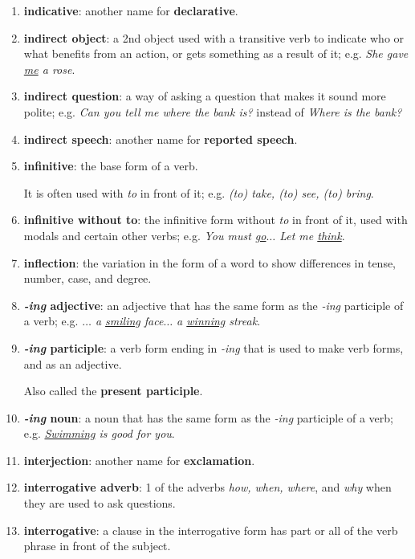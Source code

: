 \documentclass[oneside]{book}
\numberwithin{equation}{section}
\begin{document}
\begin{enumerate}
    \item \textbf{indicative}: another name for \textbf{declarative}.
    \item \textbf{indirect object}: a 2nd object used with a transitive verb to indicate who or what benefits from an action, or gets something as a result of it; e.g. \textit{She gave \underline{me} a rose}.
    \item \textbf{indirect question}: a way of asking a question that makes it sound more polite; e.g. \textit{Can you tell me where the bank is?} instead of \textit{Where is the bank?}
    \item \textbf{indirect speech}: another name for \textbf{reported speech}.
    \item \textbf{infinitive}: the base form of a verb.
    
    It is often used with \textit{to} in front of it; e.g. \textit{(to) take, (to) see, (to) bring}.
    \item \textbf{infinitive without to}: the infinitive form without \textit{to} in front of it, used with modals and certain other verbs; e.g. \textit{You must \underline{go}$\ldots$ Let me \underline{think}}.
    \item \textbf{inflection}: the variation in the form of a word to show differences in tense, number, case, and degree.
    \item \textbf{\textit{-ing} adjective}: an adjective that has the same form as the \textit{-ing} participle of a verb; e.g. \textit{$\ldots$ a \underline{smiling} face$\ldots$ a \underline{winning} streak}.
    \item \textbf{\textit{-ing} participle}: a verb form ending in \textit{-ing} that is used to make verb forms, and as an adjective.
    
    Also called the \textbf{present participle}.
    \item \textbf{\textit{-ing} noun}: a noun that has the same form as the \textit{-ing} participle of a verb; e.g. \textit{\underline{Swimming} is good for you}.
    \item \textbf{interjection}: another name for \textbf{exclamation}.
    \item \textbf{interrogative adverb}: 1 of the adverbs \textit{how, when, where}, and \textit{why} when they are used to ask questions.
    \item \textbf{interrogative}: a clause in the interrogative form has part or all of the verb phrase in front of the subject.
    

\end{enumerate}
\end{document}
